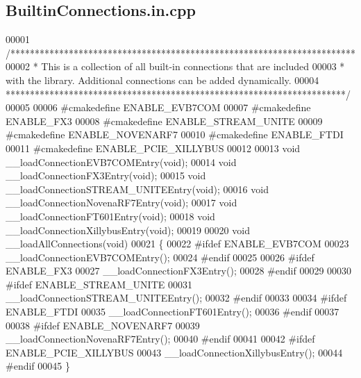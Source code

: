 \subsection{Builtin\+Connections.\+in.\+cpp}
\label{BuiltinConnections_8in_8cpp_source}

\begin{DoxyCode}
00001 \textcolor{comment}{/***********************************************************************}
00002 \textcolor{comment}{ * This is a collection of all built-in connections that are included}
00003 \textcolor{comment}{ * with the library. Additional connections can be added dynamically.}
00004 \textcolor{comment}{ **********************************************************************/}
00005 
00006 \textcolor{preprocessor}{#cmakedefine ENABLE\_EVB7COM}
00007 \textcolor{preprocessor}{#cmakedefine ENABLE\_FX3}
00008 \textcolor{preprocessor}{#cmakedefine ENABLE\_STREAM\_UNITE}
00009 \textcolor{preprocessor}{#cmakedefine ENABLE\_NOVENARF7}
00010 \textcolor{preprocessor}{#cmakedefine ENABLE\_FTDI}
00011 \textcolor{preprocessor}{#cmakedefine ENABLE\_PCIE\_XILLYBUS}
00012 
00013 \textcolor{keywordtype}{void} __loadConnectionEVB7COMEntry(\textcolor{keywordtype}{void});
00014 \textcolor{keywordtype}{void} __loadConnectionFX3Entry(\textcolor{keywordtype}{void});
00015 \textcolor{keywordtype}{void} __loadConnectionSTREAM_UNITEEntry(\textcolor{keywordtype}{void});
00016 \textcolor{keywordtype}{void} __loadConnectionNovenaRF7Entry(\textcolor{keywordtype}{void});
00017 \textcolor{keywordtype}{void} __loadConnectionFT601Entry(\textcolor{keywordtype}{void});
00018 \textcolor{keywordtype}{void} __loadConnectionXillybusEntry(\textcolor{keywordtype}{void});
00019 
00020 \textcolor{keywordtype}{void} __loadAllConnections(\textcolor{keywordtype}{void})
00021 \{
00022 \textcolor{preprocessor}{    #ifdef ENABLE\_EVB7COM}
00023     __loadConnectionEVB7COMEntry();
00024 \textcolor{preprocessor}{    #endif}
00025 
00026 \textcolor{preprocessor}{    #ifdef ENABLE\_FX3}
00027     __loadConnectionFX3Entry();
00028 \textcolor{preprocessor}{    #endif}
00029 
00030 \textcolor{preprocessor}{    #ifdef ENABLE\_STREAM\_UNITE}
00031     __loadConnectionSTREAM_UNITEEntry();
00032 \textcolor{preprocessor}{    #endif}
00033 
00034 \textcolor{preprocessor}{    #ifdef ENABLE\_FTDI}
00035     __loadConnectionFT601Entry();
00036 \textcolor{preprocessor}{    #endif}
00037 
00038 \textcolor{preprocessor}{    #ifdef ENABLE\_NOVENARF7}
00039     __loadConnectionNovenaRF7Entry();
00040 \textcolor{preprocessor}{    #endif}
00041 
00042 \textcolor{preprocessor}{    #ifdef ENABLE\_PCIE\_XILLYBUS}
00043     __loadConnectionXillybusEntry();
00044 \textcolor{preprocessor}{    #endif}
00045 \}
\end{DoxyCode}
